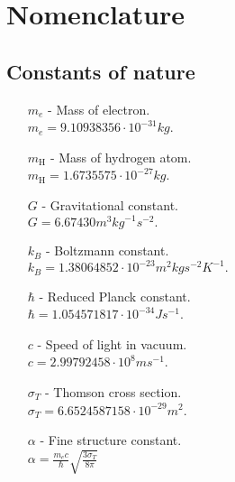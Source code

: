\section*{Nomenclature}

\subsection*{Constants of nature}
\begin{itemize}
    \item[$m_e$] - Mass of electron.\\
        $m_e = 9.10938356\cdot10^{-31}\unit{kg}$.
    \item[$m_\mathrm{H}$] - Mass of hydrogen atom. \\
        $m_\mathrm{H} = 1.6735575\cdot10^{-27}\unit{kg}$.
    \item[$G$] - Gravitational constant.\\
            $G=6.67430$$\unit{m}^3\unit{kg}^{-1}\unit{s}^{-2}.$
    \item[$k_B$] - Boltzmann constant.\\
            $k_B = 1.38064852\cdot10^{-23}\unit{m}^2\unit{kg}\unit{s}^{-2}\unit{K}^{-1}.$
    \item[$\hbar$] - Reduced Planck constant.\\
            $\hbar = 1.054571817\cdot10^{-34}\unit{J}\unit{s}^{-1}$.
    \item[$c$] - Speed of light in vacuum.\\
            $c=2.99792458 \cdot10^8\unit{m}\unit{s}^{-1}$.
    \item[$\sigma_T$] - Thomson cross section.\\
            $\sigma_T = 6.6524587158\cdot10^{-29} \unit{m}^2$.
    \item[$\alpha$] - Fine structure constant.\\
        $\alpha = \frac{m_ec}{\hbar}\sqrt{\frac{3\sigma_T}{8\pi}}$
\end{itemize}

